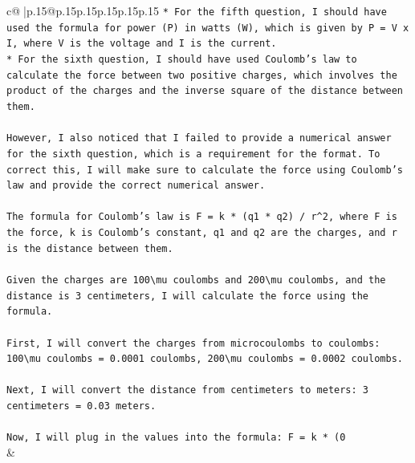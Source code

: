 \documentclass{article}
\begin{document}
{\begin{supertabular}{c@{$\;$}|p{.15\linewidth}@{}p{.15\linewidth}p{.15\linewidth}p{.15\linewidth}p{.15\linewidth}p{.15\linewidth}}
{{{\texttt{* For the fifth question, I should have used the formula for power (P) in watts (W), which is given by P = V x I, where V is the voltage and I is the current.} \\
\texttt{* For the sixth question, I should have used Coulomb's law to calculate the force between two positive charges, which involves the product of the charges and the inverse square of the distance between them.} \\
\\ 
\texttt{However, I also noticed that I failed to provide a numerical answer for the sixth question, which is a requirement for the format. To correct this, I will make sure to calculate the force using Coulomb's law and provide the correct numerical answer.} \\
\\ 
\texttt{The formula for Coulomb's law is F = k * (q1 * q2) / r\^{}2, where F is the force, k is Coulomb's constant, q1 and q2 are the charges, and r is the distance between them.} \\
\\ 
\texttt{Given the charges are 100\textbackslash{}mu coulombs and 200\textbackslash{}mu coulombs, and the distance is 3 centimeters, I will calculate the force using the formula.} \\
\\ 
\texttt{First, I will convert the charges from microcoulombs to coulombs: 100\textbackslash{}mu coulombs = 0.0001 coulombs, 200\textbackslash{}mu coulombs = 0.0002 coulombs.} \\
\\ 
\texttt{Next, I will convert the distance from centimeters to meters: 3 centimeters = 0.03 meters.} \\
\\ 
\texttt{Now, I will plug in the values into the formula: F = k * (0} \\
            }
        }
    }
    & \\ \\

\end{supertabular}
}
\end{document}
